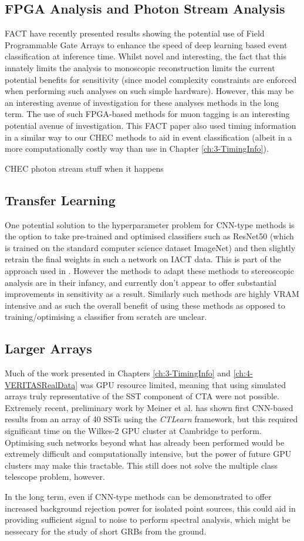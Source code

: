 \subsection{FPGA Analysis and Photon Stream Analysis}

FACT have recently presented results showing the potential use of Field Programmable Gate Arrays to enhance the speed of deep learning based event classification at inference time. Whilst novel and interesting, the fact that this innately limits the analysis to monoscopic reconstruction limits the current potential benefits for sensitivity (since model complexity constraints are enforced when performing such analyses on such simple hardware). However, this may be an interesting avenue of investigation for these analyses methods in the long term. The use of such FPGA-based methods for muon tagging is an interesting potential avenue of investigation. This FACT paper also used timing information in a similar way to our CHEC methods to aid in event classification (albeit in a more computationally costly way than use in Chapter \ref{ch:3-TimingInfo}).

CHEC photon stream stuff when it happens
\subsection{Transfer Learning}
One potential solution to the hyperparameter problem for CNN-type methods is the option to take pre-trained and optimised classifiers such as ResNet50 \cite{resnet50} (which is trained on the standard computer science dataset ImageNet) and then slightly retrain the final weights in such a network on IACT data. This is part of the approach used in \cite{tjarkicrc}. However the methods to adapt these methods to stereoscopic analysis are in their infancy, and currently don't appear to offer substantial improvements in sensitivity as a result. Similarly such methods are highly VRAM intensive and as such the overall benefit of using these methods as opposed to training/optimising a classifier from scratch are unclear.


\subsection{Larger Arrays}
Much of the work presented in Chapters \ref{ch:3-TimingInfo} and \ref{ch:4-VERITASRealData} was GPU resource limited, meaning that using simulated arrays truly representative of the SST component of CTA were not possible. Extremely recent, preliminary work by Meiner et al. \cite{tjarkicrc} has shown first CNN-based results from an array of 40 SSTs using the \textit{CTLearn} framework, but this required significant time on the Wilkes-2 GPU cluster at Cambridge to perform. Optimising such networks beyond what has already been performed would be extremely difficult and computationally intensive, but the power of future GPU clusters may make this tractable. This still does not solve the multiple class telescope problem, however.

In the long term, even if CNN-type methods can be demonstrated to offer increased background rejection power for isolated point sources, this could aid in providing sufficient signal to noise to perform spectral analysis, which might be nessecary for the study of short GRBs from the ground.